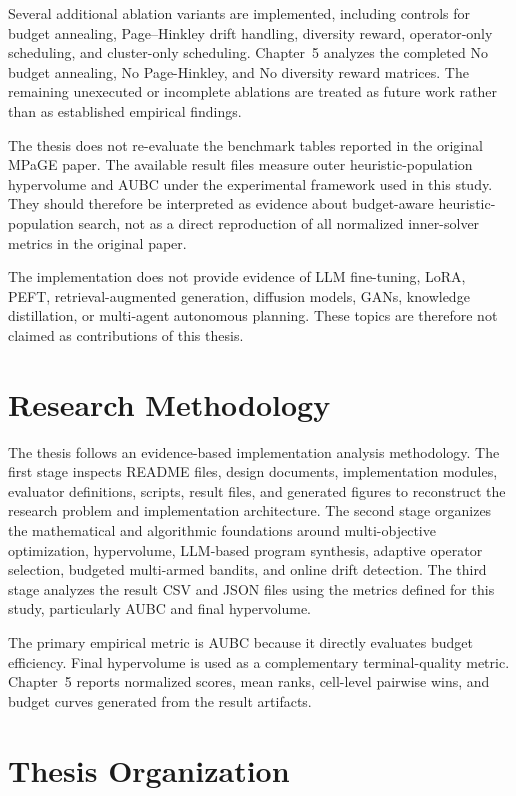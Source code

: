 Several additional ablation variants are implemented, including controls for budget annealing, Page--Hinkley drift handling, diversity reward, operator-only scheduling, and cluster-only scheduling. Chapter~5 analyzes the completed No budget annealing, No Page-Hinkley, and No diversity reward matrices. The remaining unexecuted or incomplete ablations are treated as future work rather than as established empirical findings.

The thesis does not re-evaluate the benchmark tables reported in the original MPaGE paper. The available result files measure outer heuristic-population hypervolume and AUBC under the experimental framework used in this study. They should therefore be interpreted as evidence about budget-aware heuristic-population search, not as a direct reproduction of all normalized inner-solver metrics in the original paper.

The implementation does not provide evidence of LLM fine-tuning, LoRA, PEFT, retrieval-augmented generation, diffusion models, GANs, knowledge distillation, or multi-agent autonomous planning. These topics are therefore not claimed as contributions of this thesis.

\section{Research Methodology}

The thesis follows an evidence-based implementation analysis methodology. The first stage inspects README files, design documents, implementation modules, evaluator definitions, scripts, result files, and generated figures to reconstruct the research problem and implementation architecture. The second stage organizes the mathematical and algorithmic foundations around multi-objective optimization, hypervolume, LLM-based program synthesis, adaptive operator selection, budgeted multi-armed bandits, and online drift detection. The third stage analyzes the result CSV and JSON files using the metrics defined for this study, particularly AUBC and final hypervolume.

The primary empirical metric is AUBC because it directly evaluates budget efficiency. Final hypervolume is used as a complementary terminal-quality metric. Chapter~5 reports normalized scores, mean ranks, cell-level pairwise wins, and budget curves generated from the result artifacts.

\section{Thesis Organization}

